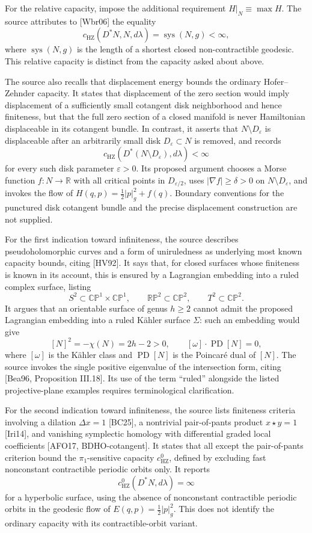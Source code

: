 \documentclass[11pt]{article}
\newcommand{\R}{\mathbb{R}}
\begin{document}
For the relative capacity, impose the additional requirement \(H|_N\equiv\max H\). The source attributes to [Wbr06] the equality
\[
c_{\mathrm{HZ}}(D^*N,N,d\lambda)=\operatorname{sys}(N,g)<\infty,
\]
where \(\operatorname{sys}(N,g)\) is the length of a shortest closed non-contractible geodesic. This relative capacity is distinct from the capacity asked about above.

The source also recalls that displacement energy bounds the ordinary Hofer--Zehnder capacity. It states that displacement of the zero section would imply displacement of a sufficiently small cotangent disk neighborhood and hence finiteness, but that the full zero section of a closed manifold is never Hamiltonian displaceable in its cotangent bundle. In contrast, it asserts that \(N\setminus D_\varepsilon\) is displaceable after an arbitrarily small disk \(D_\varepsilon\subset N\) is removed, and records
\[
c_{\mathrm{HZ}}(D^*(N\setminus D_\varepsilon),d\lambda)<\infty
\]
for every such disk parameter \(\varepsilon>0\). Its proposed argument chooses a Morse function \(f:N\to\R\) with all critical points in \(D_{\varepsilon/2}\), uses \(|\nabla f|\geq\delta>0\) on \(N\setminus D_\varepsilon\), and invokes the flow of \(H(q,p)=\tfrac12|p|_g^2+f(q)\). Boundary conventions for the punctured disk cotangent bundle and the precise displacement construction are not supplied.

For the first indication toward infiniteness, the source describes pseudoholomorphic curves and a form of uniruledness as underlying most known capacity bounds, citing [HV92]. It says that, for closed surfaces whose finiteness is known in its account, this is ensured by a Lagrangian embedding into a ruled complex surface, listing
\[
S^2\subset\mathbb{CP}^1\times\mathbb{CP}^1,\qquad
\mathbb{RP}^2\subset\mathbb{CP}^2,\qquad
T^2\subset\mathbb{CP}^2.
\]
It argues that an orientable surface of genus \(h\geq2\) cannot admit the proposed Lagrangian embedding into a ruled K\"ahler surface \(\Sigma\): such an embedding would give
\[
[N]^2=-\chi(N)=2h-2>0,\qquad
[\omega]\cdot\operatorname{PD}[N]=0,
\]
where \([\omega]\) is the K\"ahler class and \(\operatorname{PD}[N]\) is the Poincar\'e dual of \([N]\). The source invokes the single positive eigenvalue of the intersection form, citing [Bea96, Proposition III.18]. Its use of the term ``ruled'' alongside the listed projective-plane examples requires terminological clarification.

For the second indication toward infiniteness, the source lists finiteness criteria involving a dilation \(\Delta x=1\) [BC25], a nontrivial pair-of-pants product \(x\star y=1\) [Iri14], and vanishing symplectic homology with differential graded local coefficients [AFO17, BDHO-cotangent]. It states that all except the pair-of-pants criterion bound the \(\pi_1\)-sensitive capacity \(c_{\mathrm{HZ}}^0\), defined by excluding fast nonconstant contractible periodic orbits only. It reports
\[
c_{\mathrm{HZ}}^0(D^*N,d\lambda)=\infty
\]
for a hyperbolic surface, using the absence of nonconstant contractible periodic orbits in the geodesic flow of \(E(q,p)=\tfrac12|p|_g^2\). This does not identify the ordinary capacity with its contractible-orbit variant.
\end{document}
